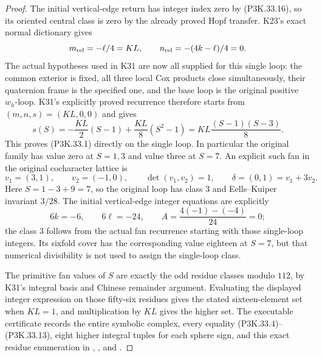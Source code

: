 \begin{proof}
The initial vertical-edge return has integer index zero by (P3K.33.16),
so its oriented central class is zero by the already proved Hopf
transfer. K23's exact normal dictionary gives
\[
 m_{\rm rel}=-\ell/4=KL,\qquad
 n_{\rm rel}=-(4k-\ell)/4=0.
\]
The actual hypotheses used in K31 are now all supplied for this
single loop: the common exterior is fixed, all three local Cox
products close simultaneously, their quaternion frame is the
specified one, and the base loop is the original positive
\(w_h\)-loop. K31's explicitly proved recurrence therefore
starts from \((m,n,s)=(KL,0,0)\) and gives
\[
 s(S)=-\frac{KL}{2}(S-1)+\frac{KL}{8}(S^2-1)
      =KL\frac{(S-1)(S-3)}8.
\]
This proves (P3K.33.1) directly on the single loop. In particular the
original family has value zero at \(S=1,3\) and value three
at \(S=7\). An explicit such fan in the original cocharacter
lattice is
\[
 v_1=(3,1),\qquad v_2=(-1,0),\qquad
 \det(v_1,v_2)=1,\qquad
 \delta=(0,1)=v_1+3v_2.
\]
Here \(S=1-3+9=7\), so the original loop has class \(3\)
and Eells--Kuiper invariant \(3/28\). The initial vertical-edge
integer equations are explicitly
\[
 6k=-6,\qquad6\ell=-24,\qquad
 A=\frac{4(-1)-(-4)}{24}=0;
\]
the class \(3\) follows from the actual fan recurrence starting
with those single-loop integers. Its sixfold cover has the corresponding value
eighteen at \(S=7\), but that numerical divisibility is not used
to assign the single-loop class.

The primitive fan values of \(S\) are exactly the odd residue
classes modulo \(112\), by K31's integral basis and Chinese
remainder argument. Evaluating the displayed integer expression
on those fifty-six residues gives the stated sixteen-element set
when \(KL=1\), and multiplication by \(KL\) gives the higher
set. The executable certificate records the entire symbolic
complex, every equality (P3K.33.4)--(P3K.33.13), eight higher integral
tuples for each sphere sign, and this exact residue enumeration in
,
, and
.
\end{proof}
